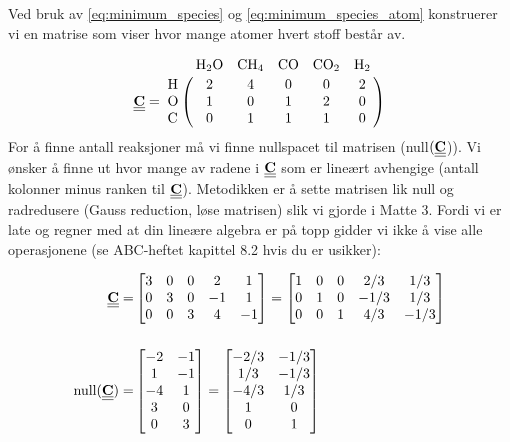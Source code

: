 Ved bruk av \cref{eq:minimum_species} og \cref{eq:minimum_species_atom} konstruerer vi en matrise som viser hvor mange atomer hvert stoff består av.

\begin{equation}
    \mymat{C} = 
    \bordermatrix{~ & \ce{H2O} & \ce{CH4} & \ce{CO} &\ce{CO2} & \ce{H2}  \cr
                  \ce{H} & 2 & 4 & 0 & 0 & 2\cr
                  \ce{O} & 1 & 0 & 1 & 2 & 0\cr
                  \ce{C} & 0 & 1 & 1 & 1 & 0\cr
                  }
\end{equation}
For å finne antall reaksjoner må vi finne nullspacet til matrisen (null$(\underline{\underline{\textbf{C}}}$)). Vi ønsker å finne ut hvor mange av radene i $\underline{\underline{\textbf{C}}}$ som er lineært avhengige (antall kolonner minus ranken til $\underline{\underline{\textbf{C}}}$). Metodikken er å sette matrisen lik null og radredusere (Gauss reduction, løse matrisen) slik vi gjorde i Matte 3. Fordi vi er late og regner med at din lineære algebra er på topp gidder vi ikke å vise alle operasjonene (se ABC-heftet kapittel 8.2 hvis du er usikker):

\begin{align}
    \underline{\underline{\textbf{C}}} =& 
    \begin{bmatrix}
        3 & 0 & 0 & 2 & 1 \\
        0 & 3 & 0 & -1 & 1 \\
        0 & 0 & 3 & 4 & -1
    \end{bmatrix}
    =
    \begin{bmatrix}
        1 & 0 & 0 & 2/3 & 1/3 \\
        0 & 1 & 0 & -1/3 & 1/3 \\
        0 & 0 & 1 & 4/3 & -1/3
    \end{bmatrix}
    \\[0.5cm]
    \text{null}(\underline{\underline{\textbf{C}}}) =& 
    \begin{bmatrix}
        -2 & -1 \\
        1 & -1 \\
        -4 & 1 \\
        3  & 0 \\
        0 & 3
    \end{bmatrix}
     =
     \begin{bmatrix}
        -2/3 & -1/3 \\
        1/3 & -1/3 \\
        -4/3 & 1/3 \\
        1  & 0 \\
        0 & 1
    \end{bmatrix}
\end{align}

